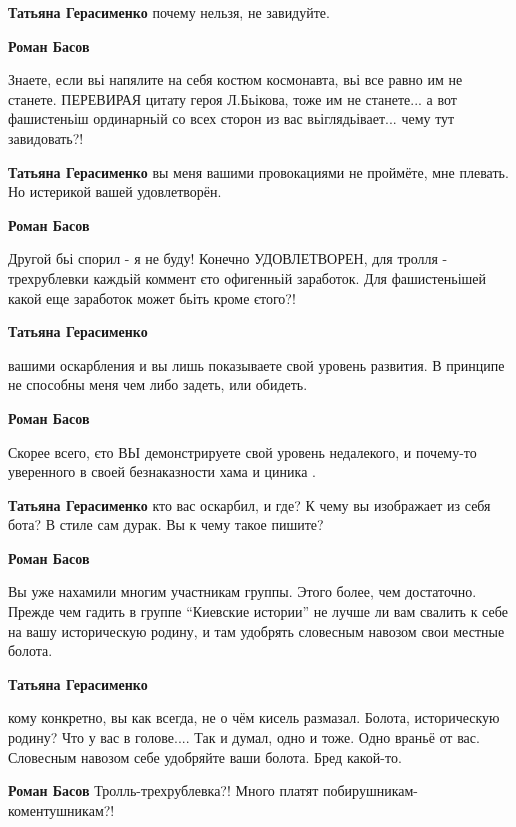 \begin{itemize}
\begin{itemize}
\begin{itemize} %
\textbf{Татьяна Герасименко} почему нельзя, не завидуйте.

\textbf{Роман Басов} 

Знаете, если вьі напялите на себя костюм космонавта, вьі все равно им не
станете. ПЕРЕВИРАЯ цитату героя Л.Бьікова, тоже им не станете... а вот
фашистеньіш ординарньій со всех сторон из вас вьіглядьівает... чему тут
завидовать?!

\textbf{Татьяна Герасименко} вы меня вашими провокациями не проймёте, мне плевать. Но истерикой вашей удовлетворён.

\textbf{Роман Басов} 

Другой бьі спорил - я не буду! Конечно УДОВЛЕТВОРЕН, для тролля - трехрублевки
каждьій коммент єто офигенньій заработок. Для фашистеньішей какой еще заработок
может бьіть кроме єтого?!

\textbf{Татьяна Герасименко} 

вашими оскарбления и вы лишь показываете свой уровень развития. В принципе не
способны меня чем либо задеть, или обидеть.

\textbf{Роман Басов} 

Скорее всего, єто ВЬІ демонстрируете свой уровень недалекого, и почему-то
уверенного в своей безнаказности хама и циника .

\textbf{Татьяна Герасименко} кто вас оскарбил, и где? К чему вы изображает из себя бота? В стиле сам дурак. Вы к чему такое пишите?

\textbf{Роман Басов} 

Вы уже нахамили многим участникам группы. Этого более, чем достаточно. Прежде
чем гадить в группе \enquote{Киевские истории} не лучше ли вам свалить к себе на вашу
историческую родину, и там удобрять словесным навозом свои местные болота.


\textbf{Татьяна Герасименко} 

кому конкретно, вы как всегда, не о чём кисель размазал. Болота, историческую
родину? Что у вас в голове.... Так и думал, одно и тоже. Одно враньё от вас.
Словесным навозом себе удобряйте ваши болота. Бред какой-то.


\textbf{Роман Басов} Тролль-трехрублевка?! Много платят побирушникам-коментушникам?!


\end{itemize}
\end{itemize}
\end{itemize}
